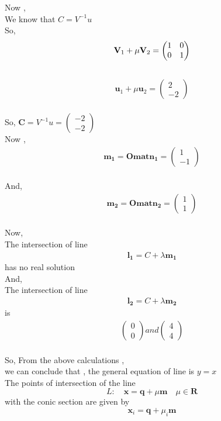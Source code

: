 \documentclass[journal,12pt,twocolumn]{IEEEtran}
\newcommand{\myvec}[1]{\ensuremath{\begin{pmatrix}#1\end{pmatrix}}}
\let\vec\mathbf
\let\vec\mathbf
\begin{document}
Now ,\\
We know that $C = V^{-1} u $\\
So, 
\begin{align}
\vec{V}_1+\mu\vec{V}_2= \myvec{
1 & 0\\
0 & \-1
}
\end{align}
\\
\begin{align}
\vec{u}_1+\mu\vec{u}_2= \myvec{
2\\
-2
}
\end{align}
\\
So, $\vec{C} = V^{-1} u = \myvec{-2 \\ -2} $
\\
Now ,\\
\begin{align}
\vec{m_1}= {\vec{Omat} }  \vec{n_1}  = \myvec{1\\ -1}
\end{align}
\\
And,\\
\begin{align}
\vec{m_2}= {\vec{Omat} }  \vec{n_2} = \myvec{1\\ 1}
\end{align}
\\
Now,\\
The intersection of line \begin{align}
\vec{l_1}= C + \lambda \vec{m_1}
\end{align} has no real solution \\
And,\\
The intersection of line \begin{align}
\vec{l_2}= C + \lambda \vec{m_2}
\end{align} is \\
\begin{align}
\myvec{ 0\\0} and \myvec{4 \\4}
\end{align}
\\
So, From the above calculations ,\\
 we can conclude that , the general equation of line is $y=x$\\
 \newpage
The points of intersection of the line 
\begin{equation}
 L: \quad \vec{x} = \vec{q} + \mu \vec{m} \quad \mu \in \mathbf{R}
\label{eq:conic_tangent}
\end{equation}
with the conic section are given by
\begin{equation}
\vec{x}_i = \vec{q} + \mu_i \vec{m}
\label{eq-32-} 
\end{equation}
\end{document}
